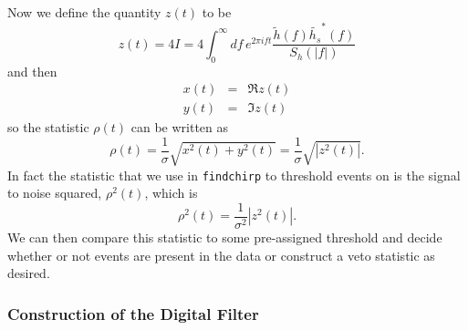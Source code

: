 Now we define the quantity $z(t)$ to be
\begin{equation}
z(t) = 4 I = 4 \int_{0}^{\infty} df\, e^{2\pi i f t}\frac{\tilde{h}(f)
\tilde{h_s}^\ast(f)}{S_h\left(\left|f\right|\right)}
\end{equation}
and then
\begin{eqnarray}
x(t) &=& \Re z(t) \\
y(t) &=& \Im z(t)
\end{eqnarray}
so the statistic $\rho(t)$ can be written as
\begin{equation}
\rho(t) = \frac{1}{\sigma} \sqrt{x^2(t) + y^2(t)} 
= \frac{1}{\sigma} \sqrt{|z^2(t)|}.
\end{equation}
In fact the statistic that we use in \texttt{findchirp} to threshold events on
is the signal to noise squared, $\rho^2 (t)$, which is
\begin{equation}
\rho^2(t) = \frac{1}{\sigma^2} \left|z^2(t)\right|.
\end{equation}
We can then compare this statistic to some pre-assigned threshold and decide
whether or not events are present in the data or construct a veto statistic
as desired.

\subsubsection*{Construction of the Digital Filter}
